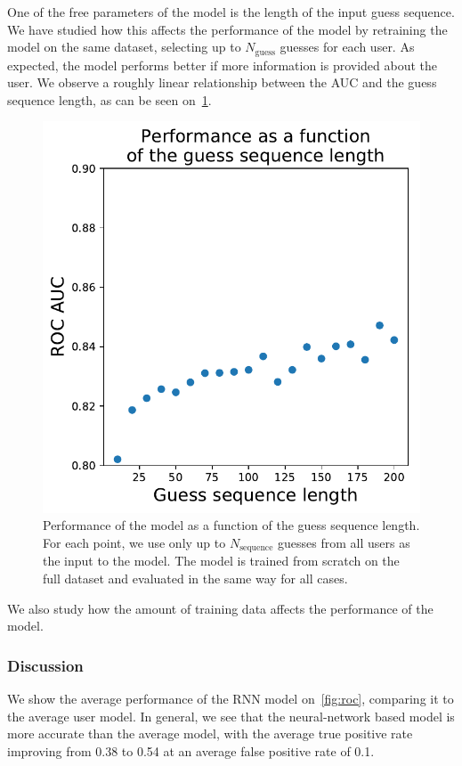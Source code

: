 One of the free parameters of the model is the length of the input guess sequence. We have studied how this affects the performance of the model by retraining the model on the same dataset, selecting up to $N_{\mathrm{guess}}$ guesses for each user. As expected, the model performs better if more information is provided about the user. We observe a roughly linear relationship between the AUC and the guess sequence length, as can be seen on~\cref{fig:seq_length}.

\begin{figure}[ht]
\centering
\includegraphics[width=0.5\linewidth]{figures/lingvist/seq_length.pdf}
\caption{Performance of the model as a function of the guess sequence length. For each point, we use only up to $N_{\mathrm{sequence}}$ guesses from all users as the input to the model. The model is trained from scratch on the full dataset and evaluated in the same way for all cases.} 
\label{fig:seq_length} 
\end{figure} 

We also study how the amount of training data affects the performance of the model.

\subsubsection{Discussion}

We show the average performance of the RNN model on~\cref{fig:roc}, comparing it to the average user model. In general, we see that the neural-network based model is more accurate than the average model, with the average true positive rate improving from 0.38 to 0.54 at an average false positive rate of 0.1.

